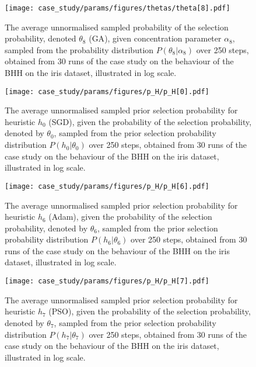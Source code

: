 \begin{figure}[htpb]
	\centering
	\texttt{[image: case\_study/params/figures/thetas/theta[8].pdf]}
	\caption{The average unnormalised sampled probability of the selection probability, denoted $\theta_{8}$ (\acs{GA}), given concentration parameter $\alpha_{8}$, sampled from the probability distribution $P(\theta_{8} \vert \alpha_{8})$ over 250 steps, obtained from 30 runs of the case study on the behaviour of the \acs{BHH} on the iris dataset, illustrated in log scale.}
	\label{fig:results:case_study:theta:8}
\end{figure}


\begin{figure}[htpb]
	\centering
	\texttt{[image: case\_study/params/figures/p\_H/p\_H[0].pdf]}
	\caption{The average unnormalised sampled prior selection probability for heuristic $h_{0}$ (\acs{SGD}), given the probability of the selection probability, denoted by $\theta_{0}$, sampled from the prior selection probability distribution $P(h_{0} \vert \theta_{0})$ over 250 steps, obtained from 30 runs of the case study on the behaviour of the \acs{BHH} on the iris dataset, illustrated in log scale.}
	\label{fig:results:case_study:p_H:0}
\end{figure}

\begin{figure}[htpb]
	\centering
	\texttt{[image: case\_study/params/figures/p\_H/p\_H[6].pdf]}
	\caption{The average unnormalised sampled prior selection probability for heuristic $h_{6}$ (\acs{Adam}), given the probability of the selection probability, denoted by $\theta_{6}$, sampled from the prior selection probability distribution $P(h_{6} \vert \theta_{6})$ over 250 steps, obtained from 30 runs of the case study on the behaviour of the \acs{BHH} on the iris dataset, illustrated in log scale.}
	\label{fig:results:case_study:p_H:6}
\end{figure}

\begin{figure}[htpb]
	\centering
	\texttt{[image: case\_study/params/figures/p\_H/p\_H[7].pdf]}
	\caption{The average unnormalised sampled prior selection probability for heuristic $h_{7}$ (\acs{PSO}), given the probability of the selection probability, denoted by $\theta_{7}$, sampled from the prior selection probability distribution $P(h_{7} \vert \theta_{7})$ over 250 steps, obtained from 30 runs of the case study on the behaviour of the \acs{BHH} on the iris dataset, illustrated in log scale.}
	\label{fig:results:case_study:p_H:7}
\end{figure}

